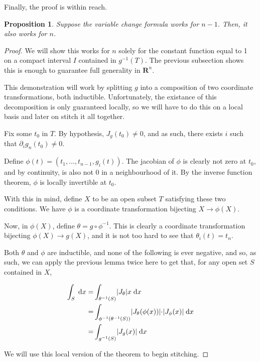 \documentclass[11pt]{article}
\theoremstyle{definition}
\theoremstyle{plain}
\newtheorem{prop}{Proposition}
\newcommand{\R}{\mathbf{R}}
\newcommand{\mo}{^{-1}}
\begin{document}
Finally, the proof is within reach.

\begin{prop}
Suppose the variable change formula works for $n-1$. Then, it also works for $n$.
\end{prop}

\begin{proof}
We will show this works for $n$ solely for the constant function equal to 1 on a compact interval $I$ contained in $g\mo(T)$. The previous subsection shows this is enough to guarantee full generality in $\R^n$.

This demonstration will work by splitting $g$ into a composition of two coordinate transformations, both inductible. Unfortunately, the existance of this decomposition is only guaranteed locally, so we will have to do this on a local basis and later on stitch it all together.

Fix some $t_0$ in $T$. By hypothesis, $J_g(t_0) \neq 0$, and as such, there exists $i$ such that $\partial_i g_n(t_0) \neq 0$.

Define $\phi(t) = (t_1, \ldots, t_{n-1}, g_i(t))$. The jacobian of $\phi$ is clearly not zero at $t_0$, and by continuity, is also not 0 in a neighbourhood of it. By the inverse function theorem, $\phi$ is locally invertible at $t_0$.

With this in mind, define $X$ to be an open subset $T$ satisfying these two conditions. We have $\phi$ is a coordinate transformation bijecting $X \rightarrow \phi(X)$.

Now, in $\phi(X)$, define $\theta = g \circ \phi\mo$. This is clearly a coordinate transformation bijecting $\phi(X) \rightarrow g(X)$, and it is not too hard to see that $\theta_i(t) = t_n$. %

Both $\theta$ and $\phi$ are inductible, and none of the following is ever negative, and so, as such, we can apply the previous lemma twice here to get that, for any open set $S$ contained in $X$,

\begin{align*}
\int_S \d x =& \int_{\theta\mo(S)} \rvert J_{\theta} \lvert x \d x \\
=& \int_{\phi\mo(\theta\mo(S))} \rvert J_{\theta}(\phi(x)) \lvert \cdot \rvert J_\phi(x) \lvert \d x \\
=& \int_{g\mo(S)} \rvert J_g(x) \lvert \d x
\end{align*}

We will use this local version of the theorem to begin stitching.


\end{proof}
\end{document}
